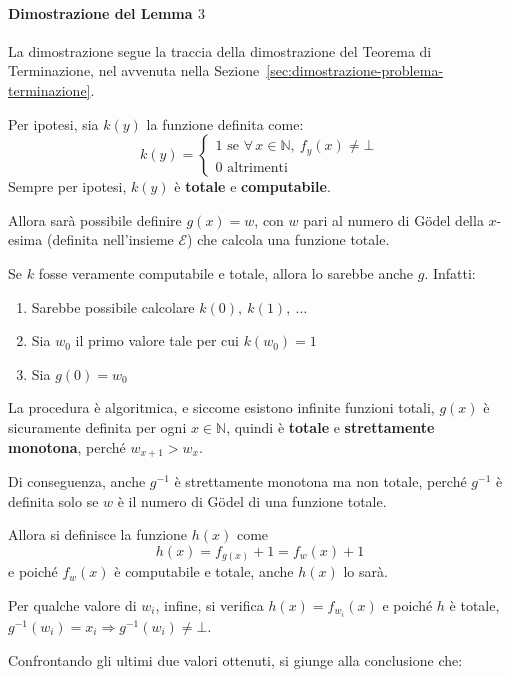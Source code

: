 \documentclass[italian, 10pt]{article}
\begin{document}
\paragraph[Dimostrazione del Lemma 3]{Dimostrazione del Lemma \(3\)}

La dimostrazione segue la traccia della dimostrazione del Teorema di Terminazione, nel avvenuta nella Sezione~\ref{sec:dimostrazione-problema-terminazione}.

Per ipotesi, sia \(k(y)\) la funzione definita come:
\[ k(y) =
  \begin{cases}
    1 \text{ se } \forall \, x \in \mathbb{N}, \ f_y(x) \neq \bot \\
    0 \text{ altrimenti }
  \end{cases}
\]
Sempre per ipotesi, \(k(y)\) è \textbf{totale} e \textbf{computabile}.

Allora sarà possibile definire \(g(x) = w\), con \(w\) pari al numero di Gödel della \(x\)-esima \TM (definita nell'insieme \(\mathscr{E}\)) che calcola una funzione totale.

Se \(k\) fosse veramente computabile e totale, allora lo sarebbe anche \(g\).
Infatti:

\begin{enumerate}
  \item Sarebbe possibile calcolare \(k(0),\ k(1),\ \ldots\)
  \item Sia \(w_0\) il primo valore tale per cui \(k(w_0) = 1\)
  \item Sia \(g(0) = w_0\)
\end{enumerate}

La procedura è algoritmica, e siccome esistono infinite funzioni totali, \(g(x)\) è sicuramente definita per ogni \(x \in \mathbb{N}\), quindi è \textbf{totale} e \textbf{strettamente monotona}, perché \(w_{x+1} > w_x\).

Di conseguenza, anche \(g^{-1}\) è strettamente monotona ma non totale, perché \(g^{-1}\) è definita solo se \(w\) è il numero di Gödel di una funzione totale.

Allora si definisce la funzione \(h(x)\) come
\[ h(x) = f_{g(x)} + 1 = f_w(x) + 1 \]
e poiché \(f_w(x)\) è computabile e totale, anche \(h(x)\) lo sarà.

Per qualche valore di \(w_i\), infine, si verifica \(h(x) = f_{w_i}(x)\) e poiché \(h\) è totale, \(g^{-1}(w_i) = x_i \Rightarrow g^{-1}(w_i) \neq \bot\).

Confrontando gli ultimi due valori ottenuti, si giunge alla conclusione che:
\end{document}
